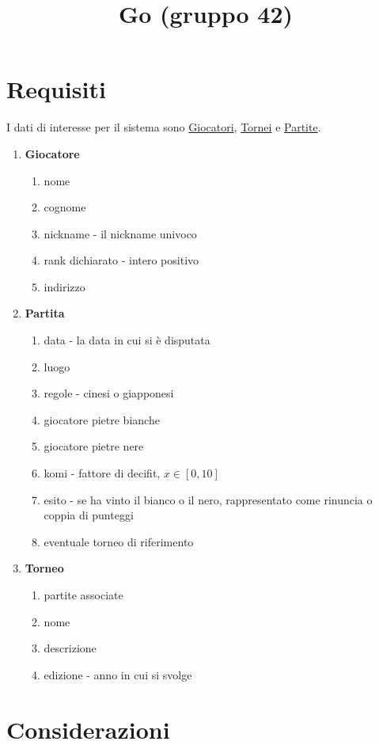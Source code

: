 \documentclass[12pt, letterpaper]{article}
\title{Go (gruppo 42)}
\date{}
\begin{document}
\maketitle


\section{Requisiti}
I dati di interesse per il sistema sono \underline{Giocatori}, \underline{Tornei} e \underline{Partite}.
\begin{enumerate}
    \item \textbf{Giocatore}\begin{enumerate}
        \item nome
        \item cognome 
        \item nickname - il nickname univoco
        \item rank dichiarato - intero positivo
        \item indirizzo
    \end{enumerate}
    \item \textbf{Partita}\begin{enumerate}
        \item data - la data in cui si è disputata 
        \item luogo 
        \item regole - cinesi o giapponesi 
        \item giocatore pietre bianche 
        \item giocatore pietre nere 
        \item komi - fattore di decifit, $x\in[0,10]$
        \item esito - se ha vinto il bianco o il nero, rappresentato come rinuncia o coppia di punteggi
        \item eventuale torneo di riferimento
    \end{enumerate}
    \item \textbf{Torneo}\begin{enumerate}
        \item partite associate 
        \item nome 
        \item descrizione 
        \item edizione - anno in cui si svolge
    \end{enumerate}
\end{enumerate}
\newpage
\section{Considerazioni}
\end{document}
